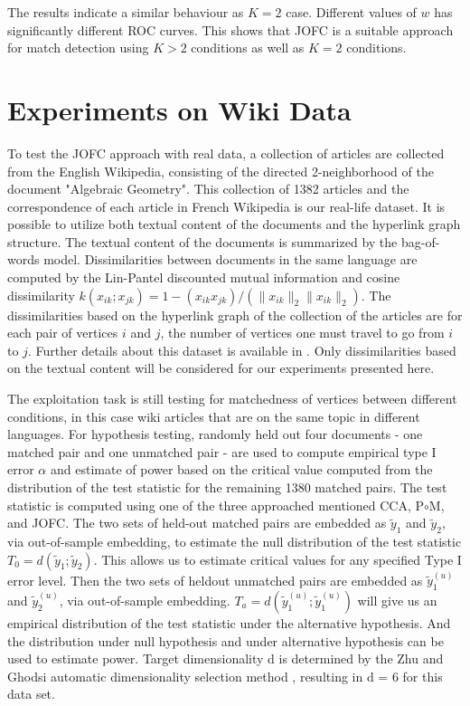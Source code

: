 \documentclass[12pt,oneside,final]{thesis}\usepackage[]{graphicx}\usepackage[]{color}
\begin{document}
The results indicate a similar behaviour as $K=2$ case. Different  values of $w$ has significantly different ROC curves. This shows that JOFC is a suitable approach for match detection using $K>2$ conditions as well as $K=2$ conditions.


\section{Experiments on Wiki Data}
To test the JOFC approach with real data, a collection of articles are collected from the English Wikipedia, consisting of the
 directed 2-neighborhood of the document "Algebraic Geometry". 
   This  collection of 1382 articles and the correspondence of each article in French 
Wikipedia is our real-life dataset. It is possible to utilize both textual content of the documents and the hyperlink graph structure. The textual content of the documents is summarized by the bag-of-words model. Dissimilarities between documents  in the same language are computed by the Lin-Pantel discounted mutual information \cite{LinPantel,PantelLin}
 and cosine dissimilarity $k(x_{ik}; x_{jk}) = 1 - (x_{ik} x_{jk})/(\|x_{ik}\|_2\|x_{ik}\|_2)$. 
 The dissimilarities based on the hyperlink graph of the collection of the articles are 
 for each pair of vertices $i$ and $j$, the number of vertices one must travel to go from $i$ to $j$.  Further details about this dataset is available in \cite{Zhiliang_disparate}.     
Only  dissimilarities based on the textual content will be considered for our experiments presented here.
   
The exploitation task is still testing for matchedness of vertices between different conditions, in this case wiki articles that are on the same topic  in  different languages.
For hypothesis testing,   randomly held out four documents - one matched pair and one unmatched pair
 -  are used to compute empirical type I error $\alpha$ and estimate of power based on the critical value computed
  from the distribution of the test statistic for the remaining 1380 matched pairs. 
The test statistic is computed using one of the three approached mentioned  CCA, P$\circ$M, and JOFC. 
The two sets of held-out matched pairs are embedded as $\tilde{y}_1$ and $\tilde{y}_2$, via out-of-sample
embedding, to estimate the null distribution of the test statistic $T_0 = d(\tilde{y}_1; \tilde{y}_2)$. This allows
us to estimate critical values for any specified Type I error level. 
Then the two sets of heldout unmatched pairs are embedded as $\tilde{y}_1^{(u)}$ and $\tilde{y}_2^{(u)}$, via out-of-sample embedding. 
$T_{a} = d(\tilde{y}_1^{(u)}; \tilde{y}_1^{(u)})$ will give us an empirical distribution of the test statistic  under the alternative hypothesis. 
And the distribution under null hypothesis and under alternative hypothesis can be used to estimate power.
Target dimensionality d is determined by the Zhu and Ghodsi  automatic dimensionality selection
method \cite{ZhuGhodsi}, resulting in d = 6 for this data set.
\end{document}
